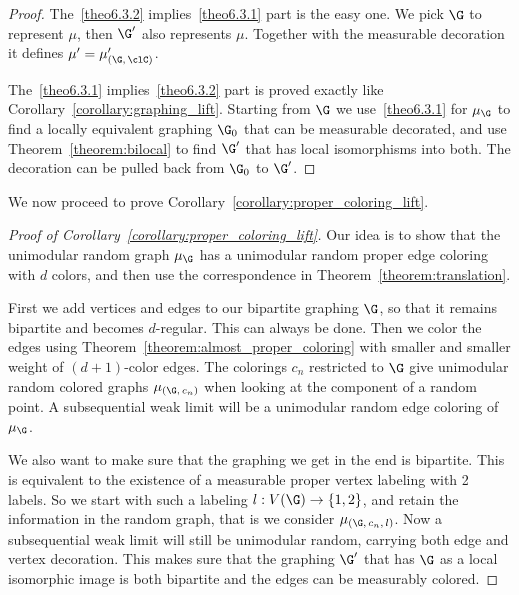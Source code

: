 \begin{proof}
The~\eqref{theo6.3.2} implies~\eqref{theo6.3.1} part is the easy one. We pick $\G$ to represent $\mu$, then $\G'$ also represents $\mu$. Together with the measurable decoration it defines $\mu'=\mu'_{(\G,\,\clC)}$.

The~\eqref{theo6.3.1} implies~\eqref{theo6.3.2} part is proved exactly like Corollary~\ref{corollary:graphing_lift}. Starting from $\G$ we use~\eqref{theo6.3.1} for $\mu_{\G}$ to find a locally equivalent graphing $\G_0$ that can be measurable decorated, and use Theorem~\ref{theorem:bilocal} to find $\G'$ that has local isomorphisms into both. The decoration can be pulled back from $\G_0$ to $\G'$.
\end{proof}


We now proceed to prove Corollary~\ref{corollary:proper_coloring_lift}.


\begin{proof}[Proof of Corollary~\ref{corollary:proper_coloring_lift}]
Our idea is to show that the unimodular random graph $\mu_{\G}$ has a unimodular random proper edge coloring with $d$ colors, and then use the correspondence in Theorem~\ref{theorem:translation}.

First we add vertices and edges to our bipartite graphing $\G$, so that it remains bipartite and becomes $d$-regular. This can always be done. Then we color the edges using Theorem~\ref{theorem:almost_proper_coloring} with smaller and smaller weight of $(d+1)$-color edges. The colorings $c_n$ restricted to $\G$ give unimodular random colored graphs $\mu_{(\G,\,c_n)}$ when looking at the component of a random point. A subsequential weak limit will be a unimodular random edge coloring of $\mu_{\G}$.

We also want to make sure that the graphing we get in the end is bipartite. This is equivalent to the existence of a measurable proper vertex labeling with 2 labels. So we start with such a labeling $l: V(\G) \to \{1,2\}$, and retain the information in the random graph, that is we consider $\mu_{(\G,\,c_n,\,l)}$. Now a subsequential weak limit will still be unimodular random, carrying both edge and vertex decoration. This makes sure that the graphing $\G'$ that has $\G$ as a local isomorphic image is both bipartite and the edges can be measurably colored.
\end{proof}



